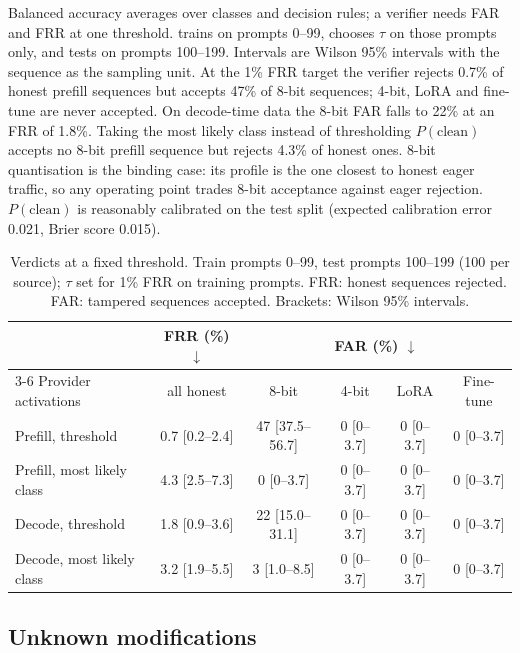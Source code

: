 \documentclass[10pt,twocolumn]{article}
\newcommand{\down}{$\downarrow$}
\newcommand{\ci}[2]{{\scriptsize[#1--#2]}}
\begin{document}
Balanced accuracy averages over classes and decision rules; a verifier needs FAR and FRR at one threshold.
 trains on prompts 0--99, chooses $\tau$ on those prompts only, and tests on prompts 100--199.
Intervals are Wilson 95\% intervals with the sequence as the sampling unit.
At the 1\% FRR target the verifier rejects 0.7\% of honest prefill sequences but accepts 47\% of 8-bit sequences; 4-bit, LoRA and fine-tune are never accepted.
On decode-time data the 8-bit FAR falls to 22\% at an FRR of 1.8\%.
Taking the most likely class instead of thresholding $P(\text{clean})$ accepts no 8-bit prefill sequence but rejects 4.3\% of honest ones.
8-bit quantisation is the binding case: its profile is the one closest to honest eager traffic, so any operating point trades 8-bit acceptance against eager rejection.
$P(\text{clean})$ is reasonably calibrated on the test split (expected calibration error 0.021, Brier score 0.015).

\begin{table}[!t]
\centering
\small
\caption{Verdicts at a fixed threshold. Train prompts 0--99, test prompts 100--199 (100 per source); $\tau$ set for 1\% FRR on training prompts. FRR: honest sequences rejected. FAR: tampered sequences accepted. Brackets: Wilson 95\% intervals.}
\label{tab:op}
\begin{tabular}{@{}lccccc@{}}
\toprule
 & FRR (\%) \down & \multicolumn{4}{c}{FAR (\%) \down} \\
\cmidrule(l){3-6}
Provider activations & all honest & 8-bit & 4-bit & LoRA & Fine-tune \\
\midrule
Prefill, threshold   & 0.7 \ci{0.2}{2.4} & 47 \ci{37.5}{56.7} & 0 \ci{0}{3.7} & 0 \ci{0}{3.7} & 0 \ci{0}{3.7} \\
Prefill, most likely class & 4.3 \ci{2.5}{7.3} & 0 \ci{0}{3.7} & 0 \ci{0}{3.7} & 0 \ci{0}{3.7} & 0 \ci{0}{3.7} \\
Decode, threshold    & 1.8 \ci{0.9}{3.6} & 22 \ci{15.0}{31.1} & 0 \ci{0}{3.7} & 0 \ci{0}{3.7} & 0 \ci{0}{3.7} \\
Decode, most likely class & 3.2 \ci{1.9}{5.5} & 3 \ci{1.0}{8.5} & 0 \ci{0}{3.7} & 0 \ci{0}{3.7} & 0 \ci{0}{3.7} \\
\bottomrule
\end{tabular}
\end{table}

\subsection{Unknown modifications}
\label{sec:res-open}
\end{document}
